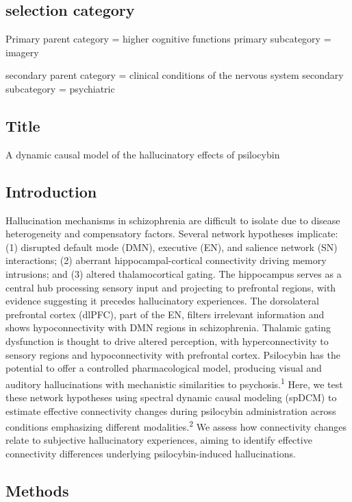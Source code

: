 \documentclass{article}
\begin{document}
\subsection{selection category}

Primary parent category = higher cognitive functions
primary subcategory = imagery

secondary parent category = clinical conditions of the nervous system
secondary subcategory = psychiatric


\subsection{Title}

A dynamic causal model of the hallucinatory effects of psilocybin

\subsection{Introduction}

Hallucination mechanisms in schizophrenia are difficult to isolate due to disease heterogeneity and compensatory factors. Several network hypotheses implicate: (1) disrupted default mode (DMN), executive (EN), and salience network (SN) interactions; (2) aberrant hippocampal-cortical connectivity driving memory intrusions; and (3) altered thalamocortical gating. The hippocampus serves as a central hub processing sensory input and projecting to prefrontal regions, with evidence suggesting it precedes hallucinatory experiences. The dorsolateral prefrontal cortex (dlPFC), part of the EN, filters irrelevant information and shows hypoconnectivity with DMN regions in schizophrenia. Thalamic gating dysfunction is thought to drive altered perception, with hyperconnectivity to sensory regions and hypoconnectivity with prefrontal cortex. Psilocybin has the potential to offer a controlled pharmacological model, producing visual and auditory hallucinations with mechanistic similarities to psychosis.\textsuperscript{1} Here, we test these network hypotheses using spectral dynamic causal modeling (spDCM) to estimate effective connectivity changes during psilocybin administration across conditions emphasizing different modalities.\textsuperscript{2} We assess how connectivity changes relate to subjective hallucinatory experiences, aiming to identify effective connectivity differences underlying psilocybin-induced hallucinations.


\subsection{Methods}
\end{document}
